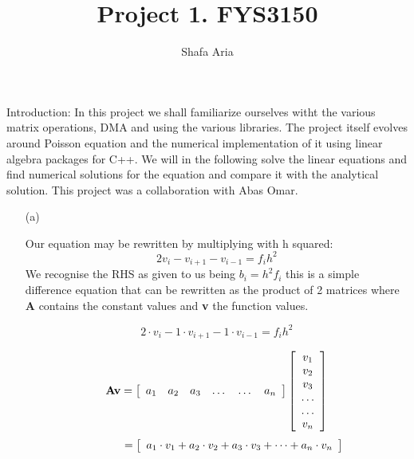 \documentclass{article}
\newcommand{\beq}{\begin{equation}}
\newcommand{\eeq}{\end{equation}}
\begin{document}
\title{Project 1. FYS3150}
\author{Shafa Aria}
\maketitle
 
Introduction:
In this project we shall familiarize ourselves witht the various matrix operations, DMA and using the various libraries. The project itself evolves around Poisson equation and the numerical implementation of it using linear algebra packages for C++. We will in the following solve the linear equations and find numerical solutions for the equation and compare it with the analytical solution. This project was a collaboration with Abas Omar. 
 
\newpage
 
 
\begin{enumerate}
\item[(a)]
 
Our equation may be rewritten by multiplying with h squared:
\[
   2v_i - v_{i+1} - v_{i-1}= f_ih^2
\]
We recognise the RHS as given to us being $b_i = h^2f_i$ this is a simple difference equation that can be rewritten as the product of 2 matrices where {\bf A} contains the constant values and {\bf v} the function values.
 
\[
   2\cdot v_i - 1\cdot v_{i+1} - 1 \cdot v_{i-1}= f_i h^2
\]
 
\beq
    {\bf Av} = \left[\begin{array}{cccccc}
                           a_1& a_2& a_3 &\dots   & \dots &a_n \\
                       \end{array} \right]\left[\begin{array}{c}
                           v_1\\
                           v_2\\
                           v_3\\
                          \dots  \\
                          \dots \\
                           v_n\\
                      \end{array} \right]
\eeq
\beq
\hspace{1.05cm} = \hspace{0cm} \left[\begin{array}{c}
                           a_1\cdot v_1 +  a_2\cdot v_2  +a_3\cdot v_3 + \dots + a_n\cdot v_n\\
                      \end{array} \right]
\eeq
 

\end{enumerate}
\end{document}
